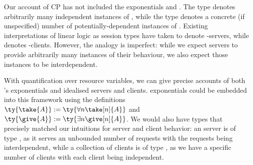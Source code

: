 \documentclass[UKenglish]{llncs}
\begin{document}
Our account of CP has not included the exponentials  and . The type  denotes arbitrarily many independent instances of
, while the type  denotes a concrete (if unspecified) number
of potentially-dependent instances of .  Existing interpretations of
linear logic as session types have taken  to denote -servers,
while  denotes -clients.  However, the analogy is imperfect:
while we expect servers to provide arbitrarily many instances of their
behaviour, we also expect those instances to be interdependent.

With quantification over resource variables, we can give precise accounts of
both \cp's exponentials and idealised servers and clients. \cp exponentials
could be embedded into this framework using the definitions $\ty{\take{A}} :=
\ty{\forall{n}\take[n]{A}}$ and $\ty{\give{A}} := \ty{\exists{n}{\give[n]{A}}}$.
We would also have types that precisely matched our intuitions for server and
client behavior:
an  server is of type , as it serves an
unbounded number of requests with the requests being interdependent, while a
collection of  clients is of type , as we have
a specific number of clients with each client being independent.

\clearpage
\printbibliography
\end{document}
